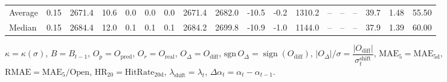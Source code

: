 \begin{threeparttable}
{\begin{tabular}{lrrrrrrrrrrrrrrrrr}
Average &     0.15 & 2671.4 &              10.6 &               0.0 &                0.0 &                0.0 & 2671.4 & 2682.0 &      -10.5 &                     -0.2 &              1310.2 &         -- &        -- &             -- &             39.7 &            1.48 &                  55.50 \\
 Median &     0.15 & 2684.4 &              12.0 &               0.1 &                0.1 &                0.1 & 2684.2 & 2699.8 &      -10.9 &                     -1.0 &              1144.0 &         -- &        -- &             -- &             37.9 &            1.39 &                  60.00 \\
\bottomrule
\end{tabular}
}
\begin{tablenotes}\footnotesize
\item $\kappa=\kappa(\sigma)$, $B=B_{t-1}$, $O_p=O_{\text{pred}}$, $O_r=O_{\text{real}}$, $O_\Delta=O_{\text{diff}}$, $\mathrm{sgn}\,O_\Delta=\operatorname{sign}(O_{\text{diff}})$, $|O_\Delta|/\sigma=\dfrac{|O_{\text{diff}}|}{\sigma_t^{\text{shift}}}$, $\mathrm{MAE}_5=\mathrm{MAE}_{5\text{d}}$, $\mathrm{RMAE}= \mathrm{MAE}_5 / \text{Open}$, $\mathrm{HR}_{20}=\mathrm{HitRate}_{20\text{d}}$, 
$\lambda_{\text{shift}}=\lambda_t$, 
$\Delta\alpha_t=\alpha_t-\alpha_{t-1}$.
\end{tablenotes}
\end{threeparttable}
\endgroup

